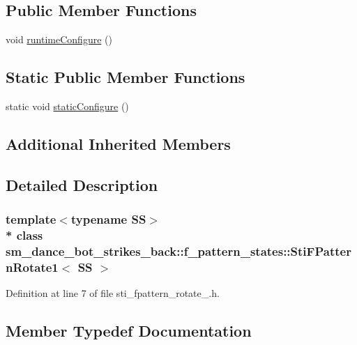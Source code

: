 \subsection*{Public Member Functions}
\begin{DoxyCompactItemize}
\item 
void \hyperlink{structsm__dance__bot__strikes__back_1_1f__pattern__states_1_1StiFPatternRotate1_a1d27a8c26bdd4a05e0644a021cc23249}{runtime\+Configure} ()
\end{DoxyCompactItemize}
\subsection*{Static Public Member Functions}
\begin{DoxyCompactItemize}
\item 
static void \hyperlink{structsm__dance__bot__strikes__back_1_1f__pattern__states_1_1StiFPatternRotate1_a1213396f19309669ac31c949446d4421}{static\+Configure} ()
\end{DoxyCompactItemize}
\subsection*{Additional Inherited Members}


\subsection{Detailed Description}
\subsubsection*{template$<$typename SS$>$\\*
class sm\+\_\+dance\+\_\+bot\+\_\+strikes\+\_\+back\+::f\+\_\+pattern\+\_\+states\+::\+Sti\+F\+Pattern\+Rotate1$<$ S\+S $>$}



Definition at line 7 of file sti\+\_\+fpattern\+\_\+rotate\+\_.\+h.



\subsection{Member Typedef Documentation}
